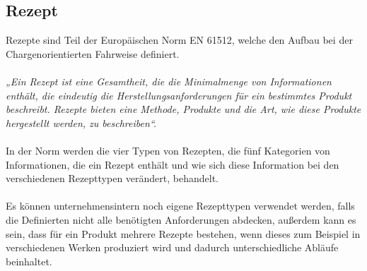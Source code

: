 \subsection{Rezept}
Rezepte sind Teil der Europäischen Norm EN 61512, welche den Aufbau bei der Chargenorientierten Fahrweise definiert.\\\\
\textit{„Ein Rezept ist eine Gesamtheit, die die Minimalmenge von Informationen enthält, die eindeutig die Herstellungsanforderungen für ein bestimmtes Produkt beschreibt. Rezepte bieten eine Methode, Produkte und die Art, wie diese Produkte hergestellt werden, zu beschreiben“.}\\\\
In der Norm werden die vier Typen von Rezepten, die fünf Kategorien von Informationen, die ein Rezept enthält und wie sich diese Information bei den verschiedenen Rezepttypen verändert, behandelt.\\\\
Es können unternehmensintern noch eigene Rezepttypen verwendet werden, falls die Definierten nicht alle benötigten Anforderungen abdecken, außerdem kann es sein, dass für ein Produkt mehrere Rezepte bestehen, wenn dieses zum Beispiel in verschiedenen Werken produziert wird und dadurch unterschiedliche Abläufe beinhaltet.\\

